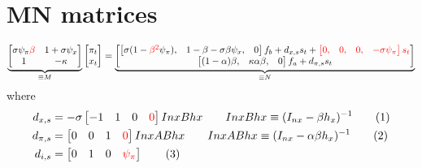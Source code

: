 \documentclass[11pt]{article}
\renewcommand{\[}{\begin{equation}}
\renewcommand{\]}{\end{equation}}
\newcommand\numberthis{\addtocounter{equation}{1}\tag{\theequation}} %
\begin{document}
\section{MN matrices}
\begin{equation}
\underbrace{\begin{bmatrix} \sigma\psi_{\pi}\textcolor{red}{\beta} &  1+\sigma\psi_x\\ 1& -\kappa \end{bmatrix}}_{\equiv M}\begin{bmatrix} \pi_t \\ x_t \end{bmatrix} = \underbrace{\begin{bmatrix} \begin{bmatrix} \sigma(1-\textcolor{red}{\beta^2}\psi_{\pi}), &1-\beta-\sigma\beta\psi_x ,&0 \end{bmatrix}f_b +d_{x,s} s_t + \textcolor{red}{\begin{bmatrix} 0, &0, &0, & -\sigma\psi_{\pi}\end{bmatrix}s_t}\\ \begin{bmatrix} (1-\alpha)\beta, &\kappa\alpha\beta ,& 0 \end{bmatrix} f_a +d_{\pi,s} s_t \end{bmatrix}}_{\equiv N}
\end{equation}
where 
\begin{align*}
 d_{x,s} & =  -\sigma\begin{bmatrix} -1 &1 & 0 & \textcolor{red}{0}  \end{bmatrix}InxBhx \quad \quad InxBhx \equiv (I_{nx}-\beta h_x)^{-1} \numberthis \\
 d_{\pi,s} & =  \begin{bmatrix} 0&0 & 1 & \textcolor{red}{0}  \end{bmatrix}InxABhx \quad \quad InxABhx \equiv (I_{nx}-\alpha\beta h_x)^{-1} \numberthis \\
  d_{i,s} & =  \begin{bmatrix} 0 &1 & 0 & \textcolor{red}{\psi_{\pi}}  \end{bmatrix} \numberthis
\end{align*}
\end{document}
